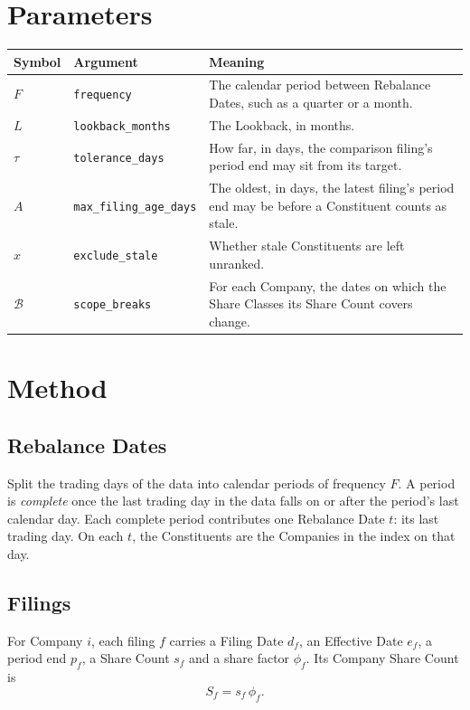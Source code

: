 \documentclass[11pt]{article}
\newcommand{\param}[3]{#1 & \texttt{#2} & #3 \\}
\begin{document}
\section{Parameters}

\begin{center}
\begin{tabularx}{\linewidth}{l l X}
\toprule
Symbol & Argument & Meaning \\
\midrule
\param{$F$}{frequency}{The calendar period between Rebalance Dates, such as a quarter or a month.}
\param{$L$}{lookback\_months}{The Lookback, in months.}
\param{$\tau$}{tolerance\_days}{How far, in days, the comparison filing's period end may sit from its target.}
\param{$A$}{max\_filing\_age\_days}{The oldest, in days, the latest filing's period end may be before a Constituent counts as stale.}
\param{$x$}{exclude\_stale}{Whether stale Constituents are left unranked.}
\param{$\mathcal{B}$}{scope\_breaks}{For each Company, the dates on which the Share Classes its Share Count covers change.}
\bottomrule
\end{tabularx}
\end{center}

\section{Method}

\subsection{Rebalance Dates}

Split the trading days of the data into calendar periods of frequency $F$. A period is
\emph{complete} once the last trading day in the data falls on or after the period's last
calendar day. Each complete period contributes one Rebalance Date $t$: its last trading day.
On each $t$, the Constituents are the Companies in the index on that day.

\subsection{Filings}

For Company $i$, each filing $f$ carries a Filing Date $d_f$, an Effective Date $e_f$, a
period end $p_f$, a Share Count $s_f$ and a share factor $\phi_f$. Its Company Share Count is
\begin{equation}
  S_f = s_f \, \phi_f .
\end{equation}
\end{document}
